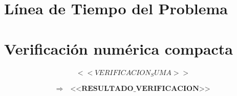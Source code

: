 \documentclass[12pt,a4paper]{article}
\begin{document}
\section*{L\'inea de Tiempo del Problema}

\vspace{0.5cm}

\begin{center}
\end{center}

\vspace{0.8cm}

\section*{Verificaci\'on num\'erica compacta}

\begin{align*}
<<VERIFICACION_SUMA>>
\end{align*}

\[
\Rightarrow\quad \boxed{\textbf{<<RESULTADO_VERIFICACION>>}}
\]
\end{document}
